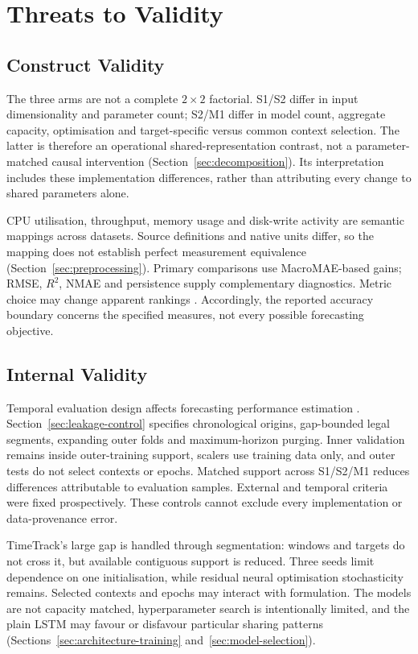 \documentclass[a4paper,fleqn]{cas-dc}
\begin{document}
\section{Threats to Validity}
\label{sec:threats}

\subsection{Construct Validity}
\label{sec:threats-construct}

The three arms are not a complete $2\times2$ factorial. S1/S2 differ in input
dimensionality and parameter count; S2/M1 differ in model count, aggregate
capacity, optimisation and target-specific versus common context selection.
The latter is therefore an operational shared-representation contrast, not a
parameter-matched causal intervention
(Section~\ref{sec:decomposition}). Its interpretation includes these
implementation differences, rather than attributing every change to shared
parameters alone.

CPU utilisation, throughput, memory usage and disk-write activity are semantic
mappings across datasets. Source definitions and native units differ, so the
mapping does not establish perfect measurement equivalence
(Section~\ref{sec:preprocessing}). Primary comparisons use MacroMAE-based
gains; RMSE, $R^2$, NMAE and persistence supply complementary diagnostics.
Metric choice may change apparent rankings \citep{Hyndman2006Accuracy}.
Accordingly, the reported accuracy boundary concerns the specified measures,
not every possible forecasting objective.

\subsection{Internal Validity}
\label{sec:threats-internal}

Temporal evaluation design affects forecasting performance estimation
\citep{Cerqueira2020Evaluation,Hyndman2021Forecasting}.
Section~\ref{sec:leakage-control} specifies chronological origins,
gap-bounded legal segments, expanding outer folds and maximum-horizon purging.
Inner validation remains inside outer-training support, scalers use training
data only, and outer tests do not select contexts or epochs. Matched support
across S1/S2/M1 reduces differences attributable to evaluation samples.
External and temporal criteria were fixed prospectively. These controls cannot
exclude every implementation or data-provenance error.

TimeTrack's large gap is handled through segmentation: windows and targets do
not cross it, but available contiguous support is reduced.
Three seeds limit dependence on one initialisation, while residual neural
optimisation stochasticity remains. Selected contexts and epochs may interact
with formulation. The models are not capacity matched, hyperparameter search
is intentionally limited, and the plain LSTM may favour or disfavour particular
sharing patterns (Sections~\ref{sec:architecture-training}
and~\ref{sec:model-selection}).
\end{document}

